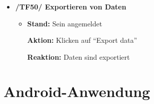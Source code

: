 \documentclass[a4paper]{scrreprt}
\begin{document}
\begin{itemize}
                \item \textbf{/TF50/ Exportieren von Daten}
                \begin{itemize}
                    \item \par \textbf{Stand: }Sein angemeldet
                          \par \textbf{Aktion: }Klicken auf ``Export data''
                          \par \textbf{Reaktion: }Daten sind exportiert
                \end{itemize}


            \end{itemize}


        \vspace*{2cm}
        \section{Android-Anwendung}
\end{document}
